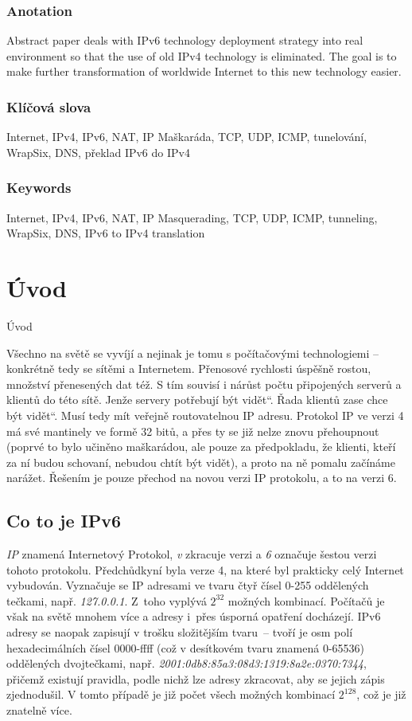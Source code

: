 \documentclass[12pt]{report}
\newcommand{\kapitola}[1]{
	\refstepcounter{chapter}
	\lhead{\thechapter. #1}
	\rhead{Michal Zima}
	\typeout{\chaptername\space\thechapter.}
	\chapter*{\protect\thechapter\hspace{0.75em} #1}
	\addcontentsline{toc}{chapter} {
		\protect\numberline{\thechapter}#1
	}
}
\newcommand\uv[1]{\quotedblbase #1\textquotedblleft}
\begin{document}
\subsection*{Anotation}
Abstract paper deals with IPv6 technology deployment strategy into real environment so that the use of old IPv4 technology is eliminated. The goal is to make further transformation of worldwide Internet to this new technology easier.

\subsection*{Klíčová slova}
Internet, IPv4, IPv6, NAT, IP Maškaráda, TCP, UDP, ICMP, tunelování, WrapSix, DNS, překlad IPv6 do IPv4

\subsection*{Keywords}
Internet, IPv4, IPv6, NAT, IP Masquerading, TCP, UDP, ICMP, tunneling, WrapSix, DNS, IPv6 to IPv4 translation
\newpage{}

\tableofcontents
\newpage

\kapitola{Úvod}
Všechno na světě se vyvíjí a nejinak je tomu s počítačovými technologiemi -- konkrétně tedy se sítěmi a Internetem. Přenosové rychlosti úspěšně rostou, množství přenesených dat též. S tím souvisí i nárůst počtu připojených serverů a klientů do této sítě. Jenže servery potřebují \uv{být vidět}. Řada klientů zase chce \uv{být vidět}. Musí tedy mít veřejně routovatelnou IP adresu. Protokol IP ve verzi 4 má své mantinely ve formě 32 bitů, a přes ty se již nelze znovu přehoupnout (poprvé to bylo učiněno maškarádou, ale pouze za předpokladu, že klienti, kteří za ní budou schovaní, nebudou chtít být vidět), a proto na ně pomalu začínáme narážet. Řešením je pouze přechod na novou verzi IP protokolu, a to na verzi 6.

\section*{Co to je IPv6}
\textit{IP} znamená Internetový Protokol, \textit{v} zkracuje verzi a \textit{6} označuje šestou verzi tohoto protokolu. Předchůdkyní byla verze 4, na které byl prakticky celý Internet vybudován. Vyznačuje se IP adresami ve tvaru čtyř čísel 0-255 oddělených tečkami, např. \textit{127.0.0.1}. Z~toho vyplývá $2^{32}$ možných kombinací. Počítačů je však na světě mnohem více a adresy i~přes úsporná opatření docházejí. IPv6 adresy se naopak zapisují v trošku složitějším tvaru~-- tvoří je osm polí hexadecimálních čísel 0000-ffff (což v desítkovém tvaru znamená 0-65536) oddělených dvojtečkami, např. \textit{2001:0db8:85a3:08d3:1319:8a2e:0370:7344}, přičemž existují pravidla, podle nichž lze adresy zkracovat, aby se jejich zápis zjednodušil. V tomto případě je již počet všech možných kombinací $2^{128}$, což je již znatelně více.
\end{document}
